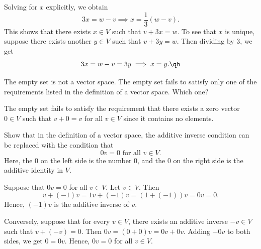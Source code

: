 \begin{sol}
    Solving for $x$ explicitly, we obtain
    \[3x = w - v \implies x = \frac13(w - v).\]
    This shows that there exists $x \in V$ such that $v + 3x = w$. To see that $x$ is unique, suppose there exists another $y \in V$ such that $v + 3y = w$. Then dividing by 3, we get
    \[3x = w - v = 3y \implies x = y. \qh\]
\end{sol}

\begin{exercise}[1b4]
    The empty set is not a vector space. The empty set fails to satisfy only one of the requirements listed in the definition of a vector space. Which one?
\end{exercise}

\begin{sol}
    The empty set fails to satisfy the requirement that there exists a zero vector $0 \in V$ such that $v + 0 = v$ for all $v \in V$ since it contains no elements.
\end{sol}

\begin{exercise}[1b5]
    Show that in the definition of a vector space, the additive inverse condition can be replaced with the condition that
    \[0v = 0 \text{ for all } v \in V.\]
    Here, the 0 on the left side is the number 0, and the 0 on the right side is the additive identity in $V$.
\end{exercise}

\begin{sol}
    Suppose that $0v = 0$ for all $v \in V$. Let $v \in V$. Then
    \[v + (-1)v = 1v + (-1)v = (1 + (-1))v = 0v = 0.\]
    Hence, $(-1)v$ is the additive inverse of $v$.
    
    Conversely, suppose that for every $v \in V$, there exists an additive inverse $-v \in V$ such that $v + (-v) = 0$. Then $0v = (0 + 0)v = 0v + 0v$. Adding $-0v$ to both sides, we get $0 = 0v$. Hence, $0v = 0$ for all $v \in V$.
\end{sol}

